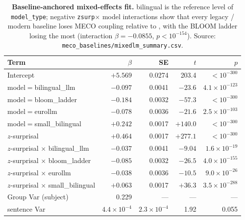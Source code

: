 \begin{table}[!ht]
  \centering
  \small
  \caption{\textbf{Baseline-anchored mixed-effects fit.} \beetle{} bilingual is the reference level of \texttt{model\_type}; negative \texttt{zsurp}$\times$ model interactions show that every legacy / modern baseline loses MECO coupling relative to \beetle{}, with the BLOOM ladder losing the most (interaction $\beta = -0.0855$, $p < 10^{-154}$). Source: \texttt{meco\_baselines/mixedlm\_summary.csv}.}
  \label{tab:sig_mixedlm_baselines}
  \begin{tabular}{lrrrr}
    \toprule
    Term & $\beta$ & SE & $t$ & $p$ \\
    \midrule
    Intercept                                    & $+5.569$  & 0.0274 & 203.4  & $<10^{-300}$ \\
    model$=$bilingual\_llm                       & $-0.097$  & 0.0041 & $-23.6$ & $4.1{\times}10^{-123}$ \\
    model$=$bloom\_ladder                        & $-0.184$  & 0.0032 & $-57.3$ & $<10^{-300}$ \\
    model$=$eurollm                              & $-0.078$  & 0.0036 & $-21.6$ & $2.5{\times}10^{-103}$ \\
    model$=$small\_bilingual                     & $+0.242$  & 0.0017 & $+140.0$ & $<10^{-300}$ \\
    $z$-surprisal                                & $+0.464$  & 0.0017 & $+277.1$ & $<10^{-300}$ \\
    $z$-surprisal $\times$ bilingual\_llm        & $-0.037$  & 0.0041 & $-9.04$ & $1.6{\times}10^{-19}$ \\
    $z$-surprisal $\times$ bloom\_ladder         & $-0.085$  & 0.0032 & $-26.5$ & $4.0{\times}10^{-155}$ \\
    $z$-surprisal $\times$ eurollm               & $-0.038$  & 0.0036 & $-10.5$ & $9.0{\times}10^{-26}$ \\
    $z$-surprisal $\times$ small\_bilingual      & $+0.063$  & 0.0017 & $+36.3$ & $3.5{\times}10^{-288}$ \\
    Group Var (subject)                          & 0.229     & ---    & ---    & --- \\
    sentence Var                                 & $4.4{\times}10^{-4}$ & $2.3{\times}10^{-4}$ & 1.92 & 0.055 \\
    \bottomrule
  \end{tabular}
\end{table}

